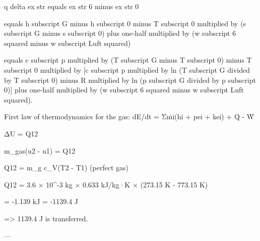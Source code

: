 q delta ex str equals ex str 6 minus ex str 0  

equals h subscript G minus h subscript 0 minus T subscript 0 multiplied by (s subscript G minus s subscript 0) plus one-half multiplied by (w subscript 6 squared minus w subscript Luft squared)  

equals c subscript p multiplied by (T subscript G minus T subscript 0) minus T subscript 0 multiplied by [c subscript p multiplied by ln (T subscript G divided by T subscript 0) minus R multiplied by ln (p subscript G divided by p subscript 0)] plus one-half multiplied by (w subscript 6 squared minus w subscript Luft squared).

First law of thermodynamics for the gas:  
dE/dt = Σṁi(hi + pei + kei) + Q̇ - Ẇ  

ΔU = Q12  

m_gas(u2 - u1) = Q12  

Q12 = m_g c_V(T2 - T1) (perfect gas)  

Q12 = 3.6 × 10^-3 kg × 0.633 kJ/kg·K × (273.15 K - 773.15 K)  

= -1.139 kJ = -1139.4 J  

=> 1139.4 J is transferred.  

---